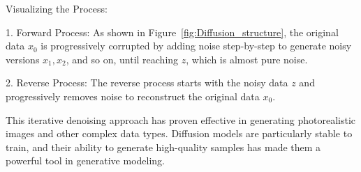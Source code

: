 Visualizing the Process:

1. Forward Process: As shown in Figure~\ref{fig:Diffusion_structure}, the original data \(x_0\) is progressively corrupted by adding noise step-by-step to generate noisy versions \(x_1, x_2\), and so on, until reaching \(z\), which is almost pure noise.

2. Reverse Process: The reverse process starts with the noisy data \(z\) and progressively removes noise to reconstruct the original data \(x_0\).

This iterative denoising approach has proven effective in generating photorealistic images and other complex data types. Diffusion models are particularly stable to train, and their ability to generate high-quality samples has made them a powerful tool in generative modeling.
